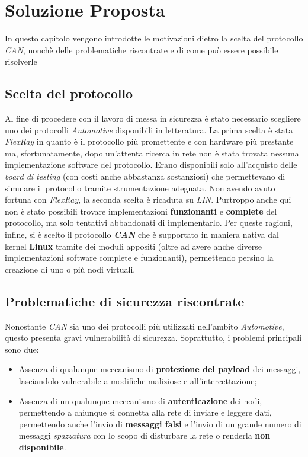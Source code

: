 \chapter{Soluzione Proposta}

\begin{citazione}
    In questo capitolo vengono introdotte le motivazioni dietro la scelta del protocollo \emph{CAN}, nonchè delle problematiche riscontrate e di come può essere possibile risolverle
\end{citazione}

\section{Scelta del protocollo}
Al fine di procedere con il lavoro di messa in sicurezza è stato necessario scegliere uno dei protocolli \emph{Automotive} disponibili in letteratura. La prima scelta è stata \emph{FlexRay} in quanto è il protocollo più promettente e con hardware più prestante ma, sfortunatamente, dopo un'attenta ricerca in rete non è stata trovata nessuna implementazione software del protocollo. Erano disponibili solo all'acquisto delle \emph{board di testing} (con costi anche abbastanza sostanziosi) che permettevano di simulare il protocollo tramite strumentazione adeguata. Non avendo avuto fortuna con \emph{FlexRay}, la seconda scelta è ricaduta su \emph{LIN}. Purtroppo anche qui non è stato possibili trovare implementazioni \textbf{funzionanti} e \textbf{complete} del protocollo, ma solo tentativi abbandonati di implementarlo. Per queste ragioni, infine, si è scelto il protocollo \textbf{\emph{CAN}} che è supportato in maniera nativa dal kernel \textbf{Linux} tramite dei moduli appositi (oltre ad avere anche diverse implementazioni software complete e funzionanti), permettendo persino la creazione di uno o più nodi virtuali.

\section{Problematiche di sicurezza riscontrate}
Nonostante \emph{CAN} sia uno dei protocolli più utilizzati nell'ambito \emph{Automotive}, questo presenta gravi vulnerabilità di sicurezza. Soprattutto, i problemi principali sono due:
\begin{itemize}
    \item Assenza di qualunque meccanismo di \textbf{protezione del payload} dei messaggi, lasciandolo vulnerabile a modifiche maliziose e all'intercettazione;
    \item Assenza di un qualunque meccanismo di \textbf{autenticazione} dei nodi, permettendo a chiunque si connetta alla rete di inviare e leggere dati, permettendo anche l'invio di \textbf{messaggi falsi} e l'invio di un grande numero di messaggi \emph{spazzatura} con lo scopo di disturbare la rete o renderla \textbf{non disponibile}.
\end{itemize}

